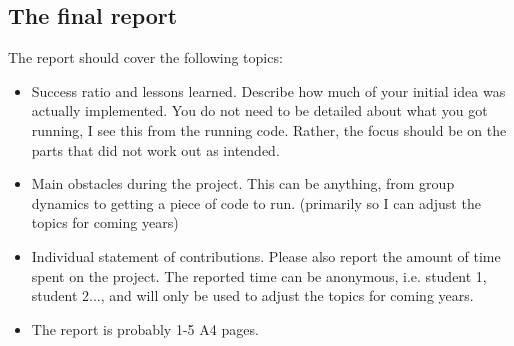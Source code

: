 \documentclass[fleqn, article, a4paper]{memoir}
\begin{document}
\subsection*{The final report}
\noindent The report should cover the following topics:
\begin{itemize}
\item Success ratio and lessons learned. Describe how much of your initial idea was actually implemented. You do not need to be detailed about what you got running, I see this from the running code. Rather, the focus should be on the parts that did not work out as intended.
\item Main obstacles during the project. This can be anything, from group dynamics to getting a piece of code to run. (primarily so I can adjust the topics for coming years)
\item Individual statement of contributions. Please also report the amount of time spent on the project. The reported time can be anonymous, i.e. student 1, student 2..., and will only be used to adjust the topics for coming years.
\item The report is probably 1-5 A4 pages.
\end{itemize}

\end{document}
